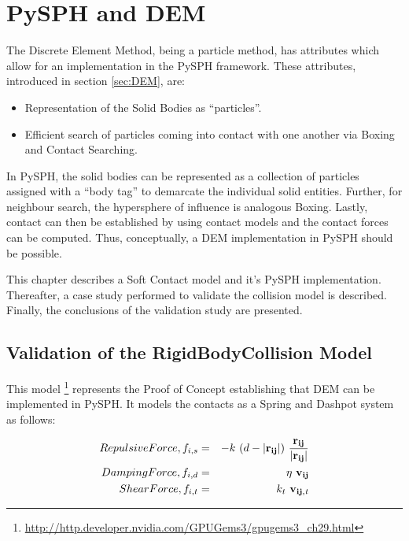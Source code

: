 \chapter{PySPH and DEM}

The Discrete Element Method, being a particle method, has attributes which allow for an implementation in the PySPH framework. These attributes, introduced in section \ref{sec:DEM}, are:

\begin{itemize}
\item Representation of the Solid Bodies as ``particles''.
\item Efficient search of particles coming into contact with one another via Boxing and Contact Searching.
\end{itemize}

In PySPH, the solid bodies can be represented as a collection of particles assigned with a ``body tag'' to demarcate the individual solid entities. Further, for neighbour search, the hypersphere of influence is analogous Boxing. Lastly, contact can then be established by using contact models and the contact forces can be computed. Thus, conceptually, a DEM implementation in PySPH should be possible.

This chapter describes a Soft Contact model and it's PySPH implementation. Thereafter, a case study performed to validate the collision model is described. Finally, the conclusions of the validation study are presented.

\section{Validation of the RigidBodyCollision Model}

This model \cite{gpu_gems}\footnote[8]{\url{http://http.developer.nvidia.com/GPUGems3/gpugems3_ch29.html}} represents the Proof of Concept establishing that DEM can be implemented in PySPH. It models the contacts as a Spring and Dashpot system as follows:

\begin{eqnarray}\label{eq:RigidBodyCollision}
Repulsive Force, f_{i,s} &=& -k~(d-|{\bf{r_{ij}}}|)~\frac{{\bf{r_{ij}}}}{|{\bf{r_{ij}}}|} \nonumber\\
Damping Force, f_{i,d} &=& \eta ~ {\bf{v_{ij}}} \\
Shear Force, f_{i,t} &=& k_{t}~{\bf{v_{ij,{\it{t}}}}} \nonumber
\end{eqnarray}

